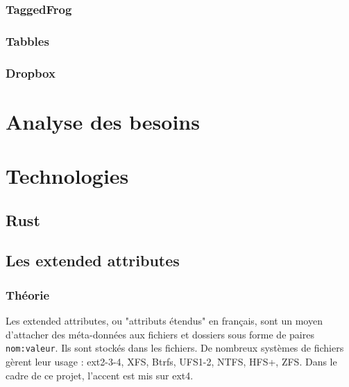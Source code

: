 \documentclass[a4paper, 12pt]{article}
\begin{document}
\subsubsection{TaggedFrog}
\subsubsection{Tabbles}
\subsubsection{Dropbox}

\section{Analyse des besoins} %



\section{Technologies} %
\subsection{Rust}
\subsection{Les extended attributes}\label{extended_attributes}
\subsubsection{Théorie}
Les extended attributes, ou "attributs étendus" en français, sont un moyen d'attacher des 
méta-données aux fichiers et dossiers sous forme de paires \texttt{nom:valeur}. Ils sont 
stockés dans les fichiers. De nombreux systèmes de fichiers gèrent leur usage : ext2-3-4, XFS, Btrfs, 
UFS1-2, NTFS, HFS+, ZFS. Dans le cadre de ce projet, l'accent est mis sur ext4. 
\end{document}

